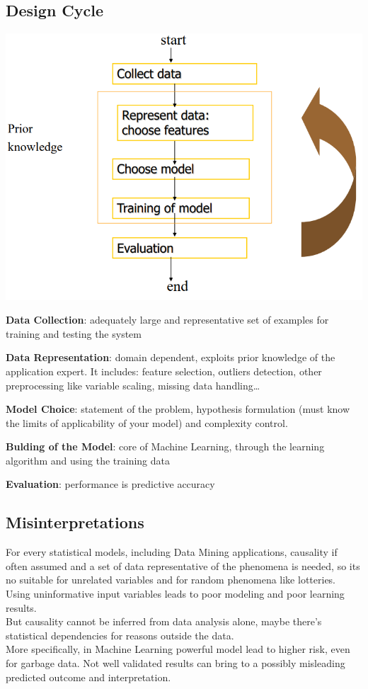 \documentclass[10pt]{report}
\begin{document}
\subsection{Design Cycle}
\begin{center}
	\includegraphics[scale=0.5]{52.png}
\end{center}
\begin{list}{}{}
	\item \textbf{Data Collection}: adequately large and representative set of examples for training and testing the system
	\item \textbf{Data Representation}: domain dependent, exploits prior knowledge of the application expert. It includes: feature selection, outliers detection, other preprocessing like variable scaling, missing data handling\ldots
	\item \textbf{Model Choice}: statement of the problem, hypothesis formulation (must know the limits of applicability of your model) and complexity control.
	\item \textbf{Bulding of the Model}: core of Machine Learning, through the learning algorithm and using the training data
	\item \textbf{Evaluation}: performance is predictive accuracy
\end{list}
\pagebreak
\subsection{Misinterpretations} For every statistical models, including Data Mining applications, causality if often assumed and a set of data representative of the phenomena is needed, so its no suitable for unrelated variables and for random phenomena like lotteries. Using uninformative input variables leads to poor modeling and poor learning results.\\
But causality cannot be inferred from data analysis alone, maybe there's statistical dependencies for reasons outside the data.\\
More specifically, in Machine Learning powerful model lead to higher risk, even for garbage data. Not well validated results can bring to a possibly misleading predicted outcome and interpretation.
\end{document}
